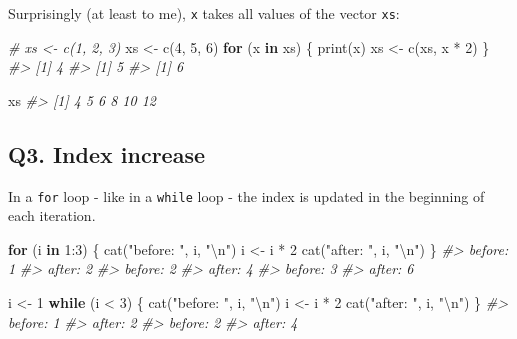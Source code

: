 \documentclass[
]{book}
\newenvironment{Shaded}{\begin{snugshade}}{\end{snugshade}}
\newcommand{\CommentTok}[1]{\textcolor[rgb]{0.56,0.35,0.01}{\textit{#1}}}
\newcommand{\ControlFlowTok}[1]{\textcolor[rgb]{0.13,0.29,0.53}{\textbf{#1}}}
\newcommand{\DecValTok}[1]{\textcolor[rgb]{0.00,0.00,0.81}{#1}}
\newcommand{\FunctionTok}[1]{\textcolor[rgb]{0.00,0.00,0.00}{#1}}
\newcommand{\NormalTok}[1]{#1}
\newcommand{\OtherTok}[1]{\textcolor[rgb]{0.56,0.35,0.01}{#1}}
\newcommand{\SpecialCharTok}[1]{\textcolor[rgb]{0.00,0.00,0.00}{#1}}
\newcommand{\StringTok}[1]{\textcolor[rgb]{0.31,0.60,0.02}{#1}}
\begin{document}
Surprisingly (at least to me), \texttt{x} takes all values of the vector \texttt{xs}:

\begin{Shaded}
\begin{Highlighting}[]
\CommentTok{\# xs \textless{}{-} c(1, 2, 3)}
\NormalTok{xs }\OtherTok{\textless{}{-}} \FunctionTok{c}\NormalTok{(}\DecValTok{4}\NormalTok{, }\DecValTok{5}\NormalTok{, }\DecValTok{6}\NormalTok{)}
\ControlFlowTok{for}\NormalTok{ (x }\ControlFlowTok{in}\NormalTok{ xs) \{}
  \FunctionTok{print}\NormalTok{(x)}
\NormalTok{  xs }\OtherTok{\textless{}{-}} \FunctionTok{c}\NormalTok{(xs, x }\SpecialCharTok{*} \DecValTok{2}\NormalTok{)}
\NormalTok{\}}
\CommentTok{\#\textgreater{} [1] 4}
\CommentTok{\#\textgreater{} [1] 5}
\CommentTok{\#\textgreater{} [1] 6}

\NormalTok{xs}
\CommentTok{\#\textgreater{} [1]  4  5  6  8 10 12}
\end{Highlighting}
\end{Shaded}

\hypertarget{q3.-index-increase}{%
\subsection*{Q3. Index increase}\label{q3.-index-increase}}

In a \texttt{for} loop - like in a \texttt{while} loop - the index is updated in the beginning of each iteration.

\begin{Shaded}
\begin{Highlighting}[]
\ControlFlowTok{for}\NormalTok{ (i }\ControlFlowTok{in} \DecValTok{1}\SpecialCharTok{:}\DecValTok{3}\NormalTok{) \{}
  \FunctionTok{cat}\NormalTok{(}\StringTok{"before: "}\NormalTok{, i, }\StringTok{"}\SpecialCharTok{\textbackslash{}n}\StringTok{"}\NormalTok{)}
\NormalTok{  i }\OtherTok{\textless{}{-}}\NormalTok{ i }\SpecialCharTok{*} \DecValTok{2}
  \FunctionTok{cat}\NormalTok{(}\StringTok{"after: "}\NormalTok{, i, }\StringTok{"}\SpecialCharTok{\textbackslash{}n}\StringTok{"}\NormalTok{)}
\NormalTok{\}}
\CommentTok{\#\textgreater{} before:  1 }
\CommentTok{\#\textgreater{} after:  2 }
\CommentTok{\#\textgreater{} before:  2 }
\CommentTok{\#\textgreater{} after:  4 }
\CommentTok{\#\textgreater{} before:  3 }
\CommentTok{\#\textgreater{} after:  6}

\NormalTok{i }\OtherTok{\textless{}{-}} \DecValTok{1}
\ControlFlowTok{while}\NormalTok{ (i }\SpecialCharTok{\textless{}} \DecValTok{3}\NormalTok{) \{}
  \FunctionTok{cat}\NormalTok{(}\StringTok{"before: "}\NormalTok{, i, }\StringTok{"}\SpecialCharTok{\textbackslash{}n}\StringTok{"}\NormalTok{)}
\NormalTok{  i }\OtherTok{\textless{}{-}}\NormalTok{ i }\SpecialCharTok{*} \DecValTok{2}
  \FunctionTok{cat}\NormalTok{(}\StringTok{"after: "}\NormalTok{, i, }\StringTok{"}\SpecialCharTok{\textbackslash{}n}\StringTok{"}\NormalTok{)}
\NormalTok{\}}
\CommentTok{\#\textgreater{} before:  1 }
\CommentTok{\#\textgreater{} after:  2 }
\CommentTok{\#\textgreater{} before:  2 }
\CommentTok{\#\textgreater{} after:  4}
\end{Highlighting}
\end{Shaded}
\end{document}
